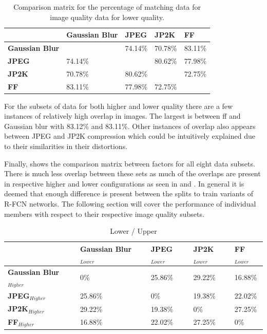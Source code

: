 \begin{table}[h]
\centering
\caption{Comparison matrix for the percentage of matching data for image quality data for lower quality.}
\label{tab:lowcomp}
\begin{tabular}{|l|l|l|l|l|}
\hline
             & \textbf{Gaussian Blur}  & \textbf{JPEG} & \textbf{JP2K} & \textbf{FF}     \\ \hline
\textbf{Gaussian Blur}  &                & 74.14\%   & 70.78\% & 83.11\% \\ \hline
\textbf{JPEG}    & 74.14\% &                & 80.62\% & 77.98\% \\ \hline
\textbf{JP2K}   & 70.78\% & 80.62\% &                & 72.75\% \\ \hline
\textbf{FF}  & 83.11\% & 77.98\% & 72.75\% &                \\ \hline
\end{tabular}
\end{table}

For the subsets of data for both higher and lower quality there are a few instances of relatively high overlap in images. The largest is between \gls{ff} and Gaussian blur with 83.12\% and 83.11\%. Other instances of overlap also appears between JPEG and JP2K compression which could be intuitively explained due to their similarities in their distortions. 

Finally,  shows the comparison matrix between factors for all eight data subsets. There is much less overlap between these sets as much of the overlaps are present in respective higher and lower configurations as seen in  and . In general it is deemed that enough difference is present between the splits to train variants of R-FCN networks. The following section will cover the performance of individual members with respect to their respective image quality subsets.

\begin{table}[]
\centering
\caption{Lower / Upper}
\label{tab:lowhighcomp}
\begin{tabular}{|l|l|l|l|l|}
\hline
                 & \textbf{Gaussian Blur$_{Lower}$} & \textbf{JPEG$_{Lower}$} & \textbf{JP2K$_{Lower}$} & \textbf{FF$_{Lower}$} \\ \hline
\textbf{Gaussian Blur$_{Higher}$}  & 0\%             & 25.86\% & 29.22\% & 16.88\%    \\ \hline
\textbf{JPEG$_{Higher}$} & 25.86\%      & 0\%        & 19.38\% & 22.02\%    \\ \hline
\textbf{JP2K$_{Higher}$} & 29.22\%      & 19.38\% & 0\%        & 27.25\%    \\ \hline
\textbf{FF$_{Higher}$} & 16.88\%      & 22.02\% & 27.25\% & 0\%           \\ \hline
\end{tabular}
\end{table}

